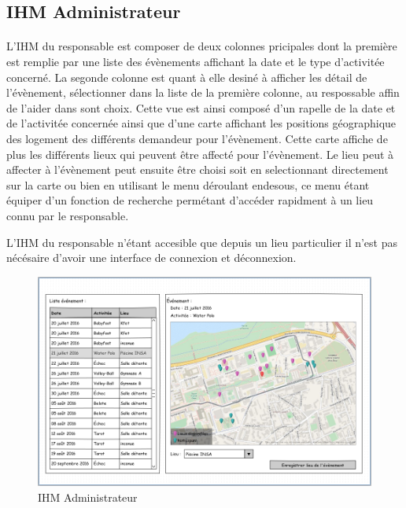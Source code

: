 \documentclass[a4paper,11pt]{article}
\begin{document}
\pagebreak
\subsection{IHM Administrateur}

\paragraph{}
L'IHM du responsable est composer de deux colonnes pricipales dont la première est remplie par une liste des évènements affichant la date et le type d'activitée concerné. La segonde colonne est quant à elle desiné à afficher les détail de l'évènement, sélectionner dans la liste de la première colonne, au respossable affin de l'aider dans sont choix. Cette vue est ainsi composé d'un rapelle de la date et de l'activitée concernée ainsi que d'une carte affichant les positions géographique des logement des différents demandeur pour l'évènement. Cette carte affiche de plus les différents lieux qui peuvent être affecté pour l'évènement. Le lieu peut à affecter à l'évènement peut ensuite être choisi soit en selectionnant directement sur la carte ou bien en utilisant le menu déroulant endesous, ce menu étant équiper d'un fonction de recherche permétant d'accéder rapidment à un lieu connu par le responsable.

L'IHM du responsable n'étant accesible que depuis un lieu particulier il n'est pas nécésaire d'avoir une interface de connexion et déconnexion.

\begin{figure}[H]
  \begin{center}
    \includegraphics[width=15cm]{../../IHM/IHM_responsable.png}
    \caption{IHM Administrateur}
  \end{center}
\end{figure}
\end{document}
